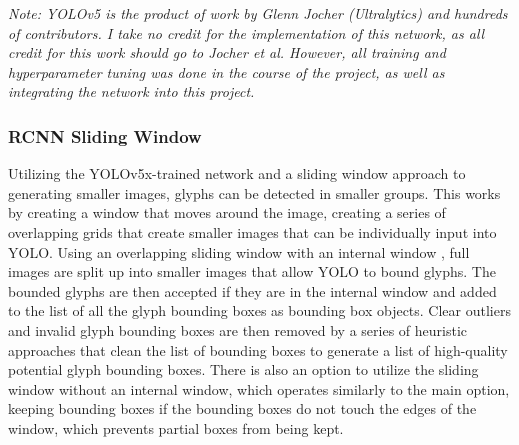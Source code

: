 \textit{Note: YOLOv5 is the product of work by Glenn Jocher (Ultralytics) and hundreds of contributors. I take no credit for the implementation of this network, as all credit for this work should go to Jocher et al. However, all training and hyperparameter tuning was done in the course of the project, as well as integrating the network into this project.}

\subsubsection{RCNN Sliding Window}

Utilizing the YOLOv5x-trained network and a sliding window approach to generating smaller images, glyphs can be detected in smaller groups. This works by creating a window that moves around the image, creating a series of overlapping grids that create smaller images that can be individually input into YOLO. Using an overlapping sliding window with an internal window , full images are split up into smaller images that allow YOLO to bound glyphs. The bounded glyphs are then accepted if they are in the internal window and added to the list of all the glyph bounding boxes as bounding box objects. Clear outliers and invalid glyph bounding boxes are then removed by a series of heuristic approaches that clean the list of bounding boxes to generate a list of high-quality potential glyph bounding boxes. There is also an option to utilize the sliding window without an internal window, which operates similarly to the main option, keeping bounding boxes if the bounding boxes do not touch the edges of the window, which prevents partial boxes from being kept.

